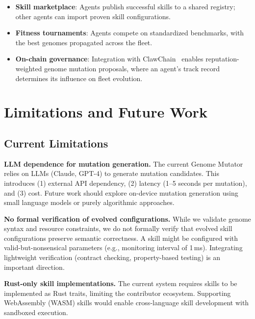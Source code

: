 \documentclass{article}
\begin{document}
\begin{itemize}[leftmargin=*]
    \item \textbf{Skill marketplace}: Agents publish successful skills to a shared registry; other agents can import proven skill configurations.
    \item \textbf{Fitness tournaments}: Agents compete on standardized benchmarks, with the best genomes propagated across the fleet.
    \item \textbf{On-chain governance}: Integration with ClawChain~\cite{clawchain} enables reputation-weighted genome mutation proposals, where an agent's track record determines its influence on fleet evolution.
\end{itemize}



\section{Limitations and Future Work}
\label{sec:limitations}

\subsection{Current Limitations}

\textbf{LLM dependence for mutation generation.} The current Genome Mutator relies on LLMs (Claude, GPT-4) to generate mutation candidates. This introduces (1) external API dependency, (2) latency (1--5 seconds per mutation), and (3) cost. Future work should explore on-device mutation generation using small language models or purely algorithmic approaches.

\textbf{No formal verification of evolved configurations.} While we validate genome syntax and resource constraints, we do not formally verify that evolved skill configurations preserve semantic correctness. A skill might be configured with valid-but-nonsensical parameters (e.g., monitoring interval of 1\,ms). Integrating lightweight verification (contract checking, property-based testing) is an important direction.

\textbf{Rust-only skill implementations.} The current system requires skills to be implemented as Rust traits, limiting the contributor ecosystem. Supporting WebAssembly (WASM) skills would enable cross-language skill development with sandboxed execution.
\end{document}
